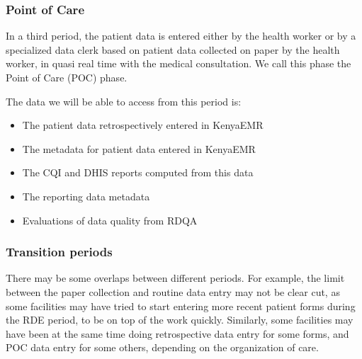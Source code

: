 \documentclass[a4paper,11pt,draft,twoside]{article}
\begin{document}
        \subsubsection{Point of Care}

In a third period, the patient data is entered either by the health worker or by a specialized data clerk based on patient data collected on paper by the health worker, in quasi real time with the medical consultation. We call this phase the Point of Care (POC) phase.

The data we will be able to access from this period is:
\begin{itemize}
\item	The patient data retrospectively entered in KenyaEMR
\item	The metadata for patient data entered in KenyaEMR
\item	The CQI and DHIS reports computed from this data
\item	The reporting data metadata
\item	Evaluations of data quality from RDQA
\end{itemize}

        \subsubsection{Transition periods}

There may be some overlaps between different periods. For example, the limit between the paper collection and routine data entry may not be clear cut, as some facilities may have tried to start entering more recent patient forms during the RDE period, to be on top of the work quickly. Similarly, some facilities may have been at the same time doing retrospective data entry for some forms, and POC data entry for some others, depending on the organization of care.
\end{document}
